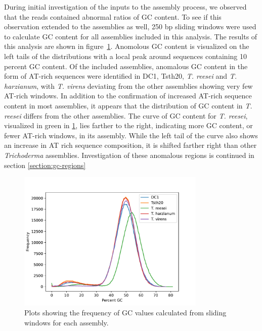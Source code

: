 During initial investigation of the inputs to the assembly process, we
observed that the reads contained abnormal ratios of GC content. To
see if this observation extended to the assemblies as well, 250 bp
sliding windows were used to calculate GC content for all assemblies
included in this analysis. The results of this analysis are shown in
figure~\ref{fig:assembly-gc}. Anomolous GC content is visualized on
the left tails of the distributions with a local peak around sequences
containing 10 percent GC content. Of the included assemblies,
anomalous GC content in the form of AT-rich sequences were identified
in DC1, Tsth20, \textit{T. reesei} and \textit{T. harzianum}, with
\textit{T. virens} deviating from the other assemblies showing very
few AT-rich windows. In addition to the confirmation of increased
AT-rich sequence content in most assemblies, it appears that the
distribution of GC content in \textit{T. reesei} differs from the
other assemblies. The curve of GC content for \textit{T. reesei},
visualized in green in \ref{fig:assembly-gc}, lies farther to the
right, indicating more GC content, or fewer AT-rich windows, in its
assembly. While the left tail of the curve also shows an increase in
AT rich sequence composition, it is shifted farther right than other
\textit{Trichoderma} assemblies. Investigation of these anomalous
regions is continued in section \ref{section:gc-regions}

\begin{figure}
  \begin{center}
    \includegraphics[width=0.8\textwidth]{figures/gc-plot.pdf}
  \end{center}
  \caption{Plots showing the frequency of GC values calculated from
    sliding windows for each assembly.}
  \label{fig:assembly-gc}
\end{figure}


